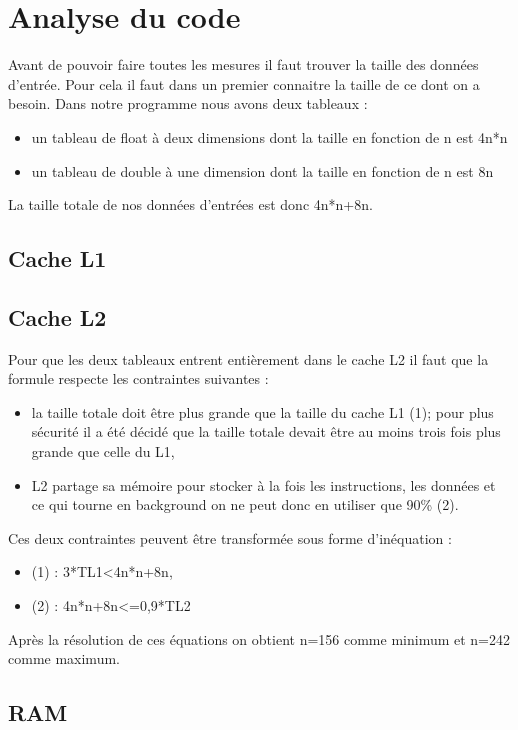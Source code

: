 \documentclass[12pt,a4paper]{article}
\begin{document}
\section{Analyse du code}

Avant de pouvoir faire toutes les mesures il faut trouver la taille des 
données d'entrée. Pour cela il faut dans un premier connaitre la taille 
de ce dont on a besoin. Dans notre programme nous avons deux tableaux :
\begin{itemize}
    \item un tableau de float à deux dimensions dont la taille en fonction
    de n est 4n*n
    \item un tableau de double à une dimension dont la taille en fonction
    de n est 8n
\end{itemize}

La taille totale de nos données d'entrées est donc 4n*n+8n.

\subsection{Cache L1}
\subsection{Cache L2}
Pour que les deux tableaux entrent entièrement dans le cache L2 il faut 
que la formule respecte les contraintes suivantes : 
\begin{itemize}
    \item la taille totale doit être plus grande que la taille du cache 
    L1 (1); pour plus sécurité il a été décidé que la taille totale devait 
    être au moins trois fois plus grande que celle du L1, 
    \item L2 partage sa mémoire pour stocker à la fois les instructions, 
    les données et ce qui tourne en background on ne peut donc en utiliser 
    que 90\% (2). 
\end{itemize}
Ces deux contraintes peuvent être transformée sous forme d'inéquation :
\begin{itemize}
    \item (1) : 3*TL1<4n*n+8n,
    \item (2) : 4n*n+8n<=0,9*TL2
\end{itemize}
Après la résolution de ces équations on obtient n=156 comme minimum et 
n=242 comme maximum.

\subsection{RAM}
\end{document}
